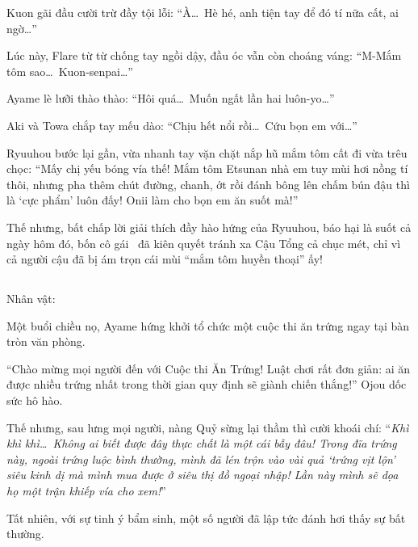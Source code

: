 \documentclass[../main.tex]{subfiles}
\begin{document}
Kuon gãi đầu cười trừ đầy tội lỗi: ``À\dots\ Hè hé, anh tiện tay để đó tí nữa cất, ai ngờ\dots''

Lúc này, Flare từ từ chống tay ngồi dậy, đầu óc vẫn còn choáng váng: ``M-Mắm tôm sao\dots\ Kuon-senpai\dots''

Ayame lè lưỡi thào thào: ``Hôi quá\dots\ Muốn ngất lần hai luôn-yo\dots''

Aki và Towa chắp tay mếu dào: ``Chịu hết nổi rồi\dots\ Cứu bọn em với\dots''

Ryuuhou bước lại gần, vừa nhanh tay vặn chặt nắp hũ mắm tôm cất đi vừa trêu chọc: ``Mấy chị yếu bóng vía thế! Mắm tôm Etsunan nhà em tuy mùi hơi nồng tí thôi, nhưng pha thêm chút đường, chanh, ớt rồi đánh bông lên chấm bún đậu thì là `cực phẩm' luôn đấy! Onii làm cho bọn em ăn suốt mà!''

Thế nhưng, bất chấp lời giải thích đầy hào hứng của Ryuuhou, báo hại là suốt cả ngày hôm đó, bốn cô gái \hll\ đã kiên quyết tránh xa Cậu Tổng cả chục mét, chỉ vì cả người cậu đã bị ám trọn cái mùi ``mắm tôm huyền thoại'' ấy!

\newpage

\subsection*{\label{ep-C9.VIII}}
\vspace{-4pt}
\begin{center}
  {\caviar\fontsize{12pt}{12pt}\selectfont Nhân vật:       }
\end{center}

Một buổi chiều nọ, Ayame hứng khởi tổ chức một cuộc thi ăn trứng ngay tại bàn tròn văn phòng.

``Chào mừng mọi người đến với Cuộc thi Ăn Trứng! Luật chơi rất đơn giản: ai ăn được nhiều trứng nhất trong thời gian quy định sẽ giành chiến thắng!'' Ojou dốc sức hô hào.

Thế nhưng, sau lưng mọi người, nàng Quỷ sừng lại thầm thì cười khoái chí: ``\textit{Khì khì khì\dots\ Không ai biết được đây thực chất là một cái bẫy đâu! Trong đĩa trứng này, ngoài trứng luộc bình thường, mình đã lén trộn vào vài quả `trứng vịt lộn' siêu kinh dị mà mình mua được ở siêu thị đồ ngoại nhập! Lần này mình sẽ dọa họ một trận khiếp vía cho xem!}''

Tất nhiên, với sự tinh ý bẩm sinh, một số người đã lập tức đánh hơi thấy sự bất thường.
\end{document}
